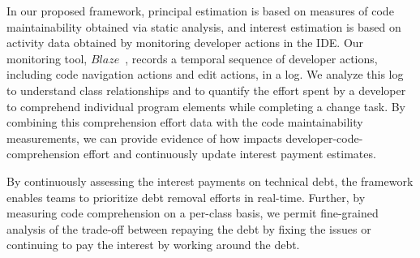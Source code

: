 In our proposed framework, principal estimation is based on measures of code maintainability obtained via static analysis, and interest estimation is based on activity data obtained by monitoring developer actions in the IDE. Our monitoring tool, $Blaze$~\cite{Snipes_etal:2014}, records a temporal sequence of developer actions, including code navigation actions and edit actions, in a log. We analyze this log to understand class relationships and to quantify the effort spent by a developer to comprehend individual program elements while completing a change task. By combining this comprehension effort data with the code maintainability measurements, we can provide evidence of how \TD impacts developer-code-comprehension effort and continuously update interest payment estimates.

By continuously assessing the interest payments on technical debt, the framework enables teams to prioritize debt removal efforts in real-time.  Further, by measuring code comprehension on a per-class basis, we permit fine-grained analysis of the trade-off between repaying the debt by fixing the issues or continuing to pay the interest by  working around the debt. %
